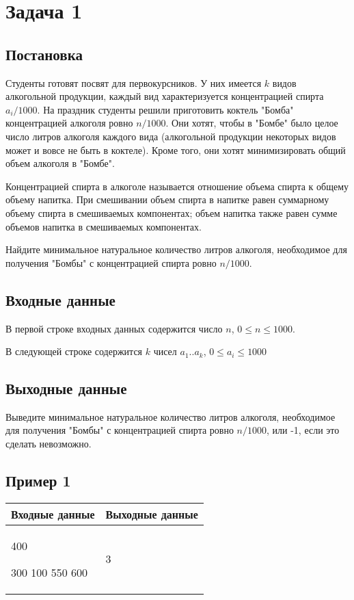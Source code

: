 \documentclass[a4]{article}
\begin{document}
\section*{Задача 1}
\label{sec:orgb62fe60}
\subsection*{Постановка}
\label{sec:org37954e9}
Студенты готовят посвят для первокурсников. У них имеется $k$ видов алкогольной продукции, каждый вид характеризуется концентрацией спирта $a_i/1000$. На праздник студенты решили приготовить коктель "Бомба" концентрацией алкоголя ровно $n/1000$. Они хотят, чтобы в "Бомбе" было целое число литров алкоголя каждого вида (алкогольной продукции некоторых видов может и вовсе не быть в коктеле). Кроме того, они хотят минимизировать общий объем алкоголя в "Бомбе". 

Концентрацией спирта в алкоголе называется отношение объема спирта к общему объему напитка. При смешивании объем спирта в напитке равен суммарному объему спирта в смешиваемых компонентах; объем напитка также равен сумме объемов напитка в смешиваемых компонентах.

Найдите минимальное натуральное количество литров алкоголя, необходимое для получения "Бомбы" с концентрацией спирта ровно $n/1000$.
\subsection*{Входные данные}
\label{sec:orgc51833b}
В первой строке входных данных содержится число $n$, $0\leq n \leq 1000$.

В следующей строке содержится $k$ чисел $a_1..a_k$, $0\leq a_i \leq 1000$
\subsection*{Выходные данные}
\label{sec:org91cd1c2}
Выведите минимальное натуральное количество литров алкоголя, необходимое для получения "Бомбы" с концентрацией спирта ровно $n/1000$, или -1, если это сделать невозможно.

\subsection*{Пример 1}
\label{sec:org1b720b0}

\begin{table}[H]
\begin{center}
\begin{tabular}{|m{4cm}|m{4cm}|}
\hline
Входные данные & Выходные данные \\ \hline
400

300 100 550 600
&
3
\\ \hline
\end{tabular}
\end{center}
\end{table}
\end{document}
